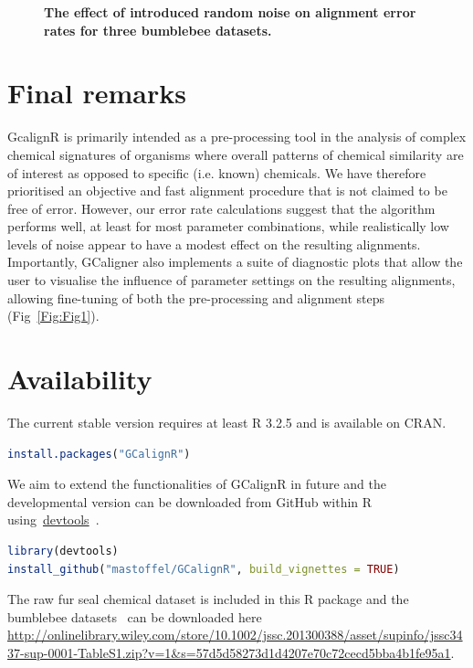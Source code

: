 \documentclass[10pt,letterpaper]{article}
\begin{document}
\begin{figure}[htbp]
\centering
\caption{\textbf{The effect of introduced random noise on alignment error rates for three bumblebee datasets.}}
\label{Fig:Fig8}
\end{figure} 

\section*{Final remarks}
GcalignR is primarily intended as a pre-processing tool in the analysis of complex chemical signatures of organisms where overall patterns of chemical similarity are of interest as opposed to specific (i.e. known) chemicals. We have therefore prioritised an objective and fast alignment procedure that is not claimed to be free of error.  However, our error rate calculations suggest that the algorithm performs well, at least for most parameter combinations, while realistically low levels of noise appear to have a modest effect on the resulting alignments. Importantly, GCaligner also implements a suite of diagnostic plots that allow the user to visualise the influence of parameter settings on the resulting alignments, allowing fine-tuning of both the pre-processing and alignment steps (Fig~\ref{Fig:Fig1}).

\section*{Availability}
The current stable version requires at least R 3.2.5 and is available on CRAN.

\begin{lstlisting}[language=R]
install.packages("GCalignR")
\end{lstlisting}

We aim to extend the functionalities of GCalignR in future and the developmental version can be downloaded from GitHub within R using~\href{https://cran.r-project.org/web/packages/devtools/index.html}{devtools}~\cite{Wickham.2016}. 

\begin{lstlisting}[language=R]
library(devtools)
install_github("mastoffel/GCalignR", build_vignettes = TRUE)
\end{lstlisting}

The raw fur seal chemical dataset is included in this R package and the bumblebee datasets~\cite{Dellicour.2013} can be downloaded here \url{http://onlinelibrary.wiley.com/store/10.1002/jssc.201300388/asset/supinfo/jssc3437-sup-0001-TableS1.zip?v=1&s=57d5d58273d1d4207e70c72cecd5bba4b1fe95a1}.
\end{document}
